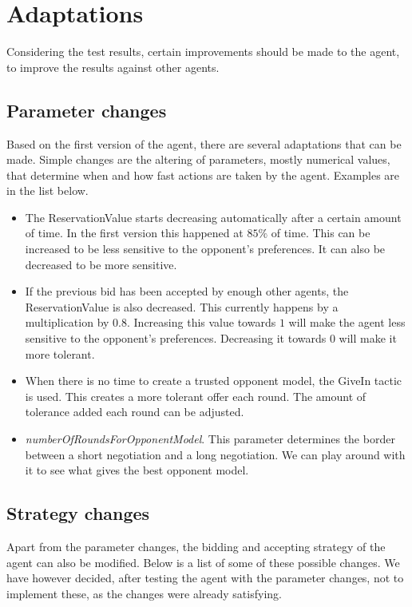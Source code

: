 \section{Adaptations}
\label{sec:adaptations}
Considering the test results, certain improvements should be made to the agent, to improve the results against other agents.

\subsection{Parameter changes}
Based on the first version of the agent, there are several adaptations that can be made. Simple changes are the altering of parameters, mostly numerical values, that determine when and how fast actions are taken by the agent. Examples are in the list below.

\begin{itemize}
\item The ReservationValue starts decreasing automatically after a certain amount of time. In the first version this happened at $85\%$ of time. This can be increased to be less sensitive to the opponent's preferences. It can also be decreased to be more sensitive.
\item If the previous bid has been accepted by enough other agents, the ReservationValue is also decreased. This currently happens by a multiplication by $0.8$. Increasing this value towards $1$ will make the agent less sensitive to the opponent's preferences. Decreasing it towards $0$ will make it more tolerant.
\item When there is no time to create a trusted opponent model, the GiveIn tactic is used. This creates a more tolerant offer each round. The amount of tolerance added each round can be adjusted.
\item \emph{numberOfRoundsForOpponentModel}. This parameter determines the border between a short negotiation and a long negotiation. We can play around with it to see what gives the best opponent model.
\end{itemize}


\subsection{Strategy changes}
\label{sec:strategy-changes}
Apart from the parameter changes, the bidding and accepting strategy of the agent can also be modified. Below is a list of some of these possible changes. We have however decided, after testing the agent with the parameter changes, not to implement these, as the changes were already satisfying.
 
